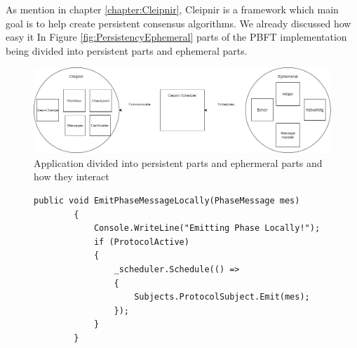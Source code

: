 As mention in chapter \autoref{chapter:Cleipnir}, Cleipnir is a framework which main goal is to help create persistent consensus algorithms. We already discussed how easy it   
In Figure \autoref{fig:PersistencyEphemeral} parts of the PBFT implementation being divided into persistent parts and ephemeral parts. 


\begin{figure}[h]
	\includegraphics[width=\linewidth]{figures/CleipnirStructurever1}
	\caption{Application divided into persistent parts and ephermeral parts and how they interact}
	\label{fig:PersistencyEphemeral}
\end{figure}

\begin{figure}[h]
	\centering
	\lstset{style=sharpc}
	\begin{lstlisting}[label = code:schedulerEmit, caption= Example of server and protocol interaction using Cleipnir scheduler, captionpos=b, basicstyle=\scriptsize]
	public void EmitPhaseMessageLocally(PhaseMessage mes)
        {
            Console.WriteLine("Emitting Phase Locally!");
            if (ProtocolActive)
            {
                _scheduler.Schedule(() =>
                {
                    Subjects.ProtocolSubject.Emit(mes);
                });    
            }
        }
	\end{lstlisting}
\end{figure}